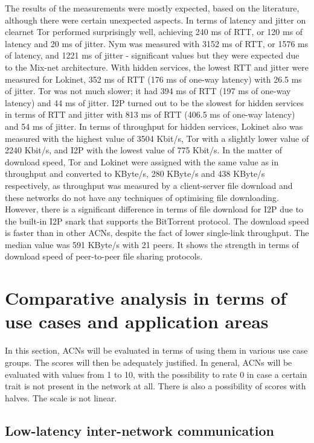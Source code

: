 The results of the measurements were mostly expected, based on the literature, although there were certain unexpected aspects.
In terms of latency and jitter on clearnet Tor performed surprisingly well, achieving 240 ms of RTT, or 120 ms of latency and 20 ms of jitter. Nym was measured with 3152 ms of RTT, or 1576 ms of latency, and 1221 ms of jitter - significant values but they were expected due to the Mix-net architecture.
With hidden services, the lowest RTT and jitter were measured for Lokinet, 352 ms of RTT (176 ms of one-way latency) with 26.5 ms of jitter. Tor was not much slower; it had 394 ms of RTT (197 ms of one-way latency) and 44 ms of jitter. I2P turned out to be the slowest for hidden services in terms of RTT and jitter with 813 ms of RTT (406.5 ms of one-way latency) and 54 ms of jitter. In terms of throughput for hidden services, Lokinet also was measured with the highest value of 3504 Kbit/s, Tor with a slightly lower value of 2240 Kbit/s, and I2P with the lowest value of 775 Kbit/s. In the matter of download speed, Tor and Lokinet were assigned with the same value as in throughput and converted to KByte/s, 280 KByte/s and 438 KByte/s respectively, as throughput was measured by a client-server file download and these networks do not have any techniques of optimising file downloading. However, there is a significant difference in terms of file download for I2P due to the built-in I2P snark that supports the BitTorrent protocol. The download speed is faster than in other ACNs, despite the fact of lower single-link throughput. The median value was 591 KByte/s with 21 peers. It shows the strength in terms of download speed of peer-to-peer file sharing protocols.


\section{Comparative analysis in terms of use cases and application areas}

In this section, ACNs will be evaluated in terms of using them in various use case groups. The scores will then be adequately justified. In general, ACNs will be evaluated with values from 1 to 10, with the possibility to rate 0 in case a certain trait is not present in the network at all. There is also a possibility of scores with halves. The scale is not linear.

\subsection{Low-latency inter-network communication}

